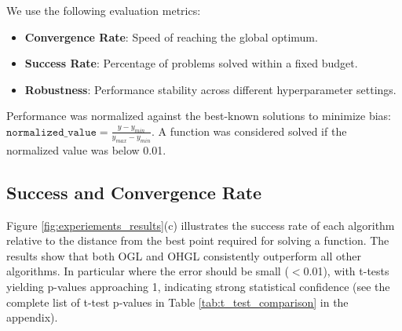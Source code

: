 We use the following evaluation metrics:
\begin{itemize}
    \item \textbf{Convergence Rate}: Speed of reaching the global optimum.
    \item \textbf{Success Rate}: Percentage of problems solved within a fixed budget.
    \item \textbf{Robustness}: Performance stability across different hyperparameter settings.
\end{itemize}

Performance was normalized against the best-known solutions to minimize bias: \(\texttt{normalized\_value} = \frac{y - y_{min}}{y_{max} - y_{min}}\). A function was considered solved if the normalized value was below 0.01.

\subsection{Success and Convergence Rate}
Figure \ref{fig:experiements_results}(c) illustrates the success rate of each algorithm relative to the distance from the best point required for solving a function. The results show that both OGL and OHGL consistently outperform all other algorithms. In particular where the error should be small ($<$0.01), with t-tests yielding p-values approaching 1, indicating strong statistical confidence (see the complete list of t-test p-values in Table \ref{tab:t_test_comparison} in the appendix).

